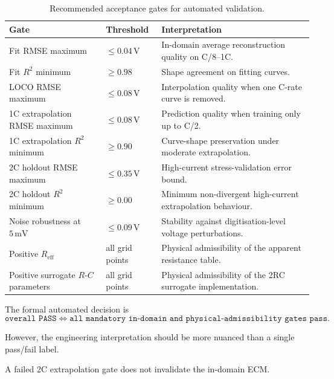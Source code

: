 \documentclass[a4paper,12pt]{article}
\begin{document}
\begin{table}[H]
\centering
\caption{Recommended acceptance gates for automated validation.}
\label{tab:method_acceptance_gates}
\begin{tabularx}{0.96\textwidth}{@{}L{0.36\textwidth}C{0.18\textwidth}Y@{}}
\toprule
\textbf{Gate} &
\textbf{Threshold} &
\textbf{Interpretation} \\
\midrule
Fit RMSE maximum &
\(\leq 0.04\,\mathrm{V}\) &
In-domain average reconstruction quality on C/8--1C. \\
Fit \(R^2\) minimum &
\(\geq 0.98\) &
Shape agreement on fitting curves. \\
LOCO RMSE maximum &
\(\leq 0.08\,\mathrm{V}\) &
Interpolation quality when one C-rate curve is removed. \\
1C extrapolation RMSE maximum &
\(\leq 0.08\,\mathrm{V}\) &
Prediction quality when training only up to C/2. \\
1C extrapolation \(R^2\) minimum &
\(\geq 0.90\) &
Curve-shape preservation under moderate extrapolation. \\
2C holdout RMSE maximum &
\(\leq 0.35\,\mathrm{V}\) &
High-current stress-validation error bound. \\
2C holdout \(R^2\) minimum &
\(\geq 0.00\) &
Minimum non-divergent high-current extrapolation behaviour. \\
Noise robustness at \(5\,\mathrm{mV}\) &
\(\leq 0.09\,\mathrm{V}\) &
Stability against digitisation-level voltage perturbations. \\
Positive \(R_{\mathrm{eff}}\) &
all grid points &
Physical admissibility of the apparent resistance table. \\
Positive surrogate \(R\)-\(C\) parameters &
all grid points &
Physical admissibility of the 2RC surrogate implementation. \\
\bottomrule
\end{tabularx}
\end{table}

The formal automated decision is
\begin{equation}
\texttt{overall PASS}
\iff
\texttt{all mandatory in-domain and physical-admissibility gates pass}.
\label{eq:overall_pass_definition}
\end{equation}

However, the engineering interpretation should be more nuanced than a single pass/fail label.

A failed 2C extrapolation gate does not invalidate the in-domain ECM.
\end{document}
